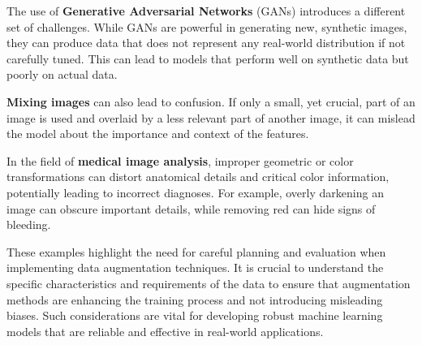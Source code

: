The use of \textbf{Generative Adversarial Networks} (GANs) introduces a different set of challenges. While GANs are powerful in generating new, synthetic images, they can produce data that does not represent any real-world distribution if not carefully tuned. This can lead to models that perform well on synthetic data but poorly on actual data.

\textbf{Mixing images} can also lead to confusion. If only a small, yet crucial, part of an image is used and overlaid by a less relevant part of another image, it can mislead the model about the importance and context of the features.

In the field of \textbf{medical image analysis}, improper geometric or color transformations can distort anatomical details and critical color information, potentially leading to incorrect diagnoses. For example, overly darkening an image can obscure important details, while removing red can hide signs of bleeding.

These examples highlight the need for careful planning and evaluation when implementing data augmentation techniques. It is crucial to understand the specific characteristics and requirements of the data to ensure that augmentation methods are enhancing the training process and not introducing misleading biases. Such considerations are vital for developing robust machine learning models that are reliable and effective in real-world applications.